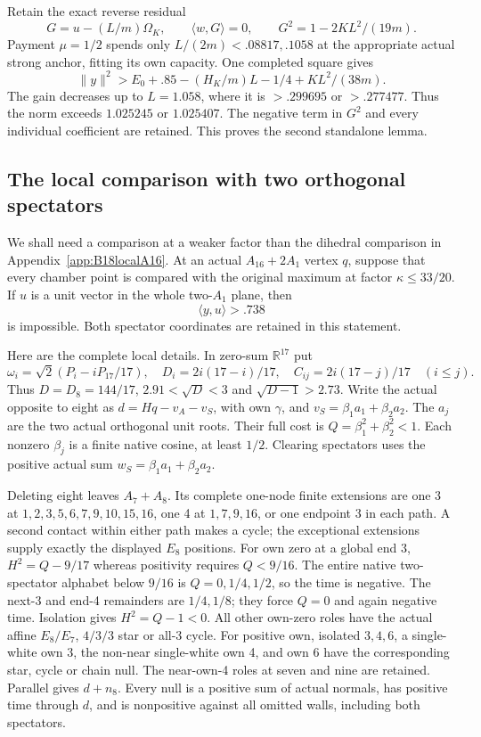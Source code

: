 \documentclass[11pt]{article}
\theoremstyle{definition}
\theoremstyle{remark}
\newcommand{\ip}[2]{\langle #1,#2\rangle}
\newcommand{\norm}[1]{\lVert #1\rVert}
\begin{document}
Retain the exact reverse residual
\[
 G=u-(L/m)\Omega_K,\qquad
 \ip wG=0,\qquad G^2=1-2KL^2/(19m).
\]
Payment \(\mu=1/2\) spends only \(L/(2m)<.08817,.1058\)
at the appropriate actual strong anchor, fitting its own capacity.
One completed square gives
\[
 \norm y^2>E_0+.85-(H_K/m)L-1/4+KL^2/(38m).
\]
The gain decreases up to \(L=1.058\), where it is
\(>.299695\) or \(>.277477\).
Thus the norm exceeds \(1.025245\) or \(1.025407\).
The negative term in \(G^2\) and every individual coefficient
are retained. This proves the second standalone lemma.

\subsection{The local comparison with two orthogonal spectators}
\label{app:D18localtwoA1}

We shall need a comparison at a weaker factor than the dihedral
comparison in Appendix~\ref{app:B18localA16}.  At an actual
\(A_{16}+2A_1\) vertex \(q\), suppose that every chamber point is
compared with the original maximum at factor
\(\kappa\le33/20\).  If \(u\) is a unit vector in the whole
two-\(A_1\) plane, then
\[
                     \ip yu>.738
\tag{D2A1}\label{eq:D2A1}
\]
is impossible.  Both spectator coordinates are retained in this
statement.

Here are the complete local details.  In zero-sum \(\mathbb R^{17}\)
put
\[
 \omega_i=\sqrt2(P_i-iP_{17}/17),\quad
 D_i=2i(17-i)/17,\quad C_{ij}=2i(17-j)/17\quad(i\le j).
\]
Thus \(D=D_8=144/17\), \(2.91<\sqrt D<3\) and
\(\sqrt{D-1}>2.73\).
Write the actual opposite to eight as
\(d=Hq-v_A-v_S\), with own \(\gamma\), and
\(v_S=\beta_1a_1+\beta_2a_2\).
The \(a_j\) are the two actual orthogonal unit roots.
Their full cost is \(Q=\beta_1^2+\beta_2^2<1\).
Each nonzero \(\beta_j\) is a finite native cosine, at least \(1/2\).
Clearing spectators uses the positive actual sum
\(w_S=\beta_1a_1+\beta_2a_2\).

Deleting eight leaves \(A_7+A_8\).
Its complete one-node finite extensions are one 3 at
\(1,2,3,5,6,7,9,10,15,16\), one 4 at
\(1,7,9,16\), or one endpoint 3 in each path.
A second contact within either path makes a cycle; the exceptional
extensions supply exactly the displayed \(E_8\) positions.
For own zero at a global end 3,
\(H^2=Q-9/17\) whereas positivity requires \(Q<9/16\).
The entire native two-spectator alphabet below \(9/16\) is
\(Q=0,1/4,1/2\), so the time is negative.
The next-3 and end-4 remainders are \(1/4,1/8\);
they force \(Q=0\) and again negative time.
Isolation gives \(H^2=Q-1<0\).
All other own-zero roles have the actual affine \(E_8/E_7\),
\(4/3/3\) star or all-3 cycle.
For positive own, isolated \(3,4,6\), a single-white own 3,
the non-near single-white own 4, and own 6 have the corresponding
star, cycle or chain null.  The near-own-4 roles at seven and nine
are retained.  Parallel gives \(d+n_8\).
Every null is a positive sum of actual normals, has positive time
through \(d\), and is nonpositive against all omitted walls,
including both spectators.
\end{document}
